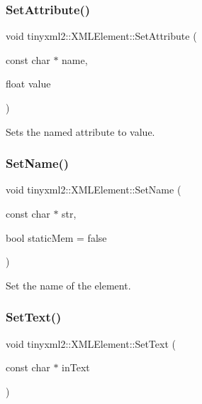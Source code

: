 \subsubsection{\texorpdfstring{Set\+Attribute()}{SetAttribute()}\hspace{0.1cm}{\footnotesize\ttfamily [7/7]}}
{\footnotesize\ttfamily void tinyxml2\+::\+X\+M\+L\+Element\+::\+Set\+Attribute (\begin{DoxyParamCaption}\item[{const char $\ast$}]{name,  }\item[{float}]{value }\end{DoxyParamCaption})\hspace{0.3cm}{\ttfamily [inline]}}



Sets the named attribute to value. 

\mbox{\label{classtinyxml2_1_1_x_m_l_element_a97712009a530d8cb8a63bf705f02b4f1}} 
\subsubsection{\texorpdfstring{Set\+Name()}{SetName()}}
{\footnotesize\ttfamily void tinyxml2\+::\+X\+M\+L\+Element\+::\+Set\+Name (\begin{DoxyParamCaption}\item[{const char $\ast$}]{str,  }\item[{bool}]{static\+Mem = {\ttfamily false} }\end{DoxyParamCaption})\hspace{0.3cm}{\ttfamily [inline]}}



Set the name of the element. 

\mbox{\label{classtinyxml2_1_1_x_m_l_element_a1f9c2cd61b72af5ae708d37b7ad283ce}} 
\subsubsection{\texorpdfstring{Set\+Text()}{SetText()}\hspace{0.1cm}{\footnotesize\ttfamily [1/7]}}
{\footnotesize\ttfamily void tinyxml2\+::\+X\+M\+L\+Element\+::\+Set\+Text (\begin{DoxyParamCaption}\item[{const char $\ast$}]{in\+Text }\end{DoxyParamCaption})}

